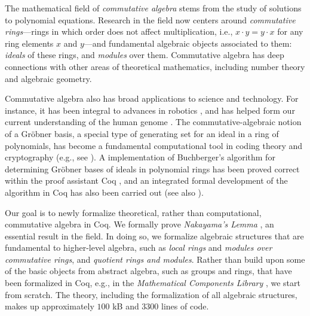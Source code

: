 \documentclass{article}
\begin{document}
The mathematical field of \emph{commutative algebra} stems from the study of solutions to polynomial equations.  Research in the field now centers around \emph{commutative rings}---rings in which order does not affect multiplication, i.e., $x \cdot y = y \cdot x$ for any ring elements $x$ and $y$---and fundamental algebraic objects associated to them:  \emph{ideals} of these rings, and \emph{modules} over them. 
Commutative algebra has deep connections with other areas of theoretical mathematics, including number theory and algebraic geometry. 

Commutative algebra also has broad applications to science and technology.  For instance, it has been integral to advances in robotics \cite{cox-little-oshea}, and has helped form our current understanding of the human genome \cite{genetic-algebra}. 
The commutative-algebraic notion of a Gr\"obner basis, a special type of generating set for an ideal in a ring of polynomials, has become a fundamental computational tool in 
coding theory and cryptography (e.g., see  \cite{grobner-bases-cryptography}).
A implementation of Buchberger's algorithm \cite{buchberger} for determining 
Gr\"obner bases of ideals in polynomial rings has been proved correct within the proof assistant Coq \cite{the_coq_development_team_2019_3476303,thery-buchberger}, and an integrated formal development of the algorithm in Coq has also been carried out \cite{persson2001integrated} (see also \cite{grobner-type-theory}). 

Our goal is to newly formalize theoretical, rather than computational, commutative algebra in Coq. 
We formally prove \emph{Nakayama's Lemma} \cite{nakayama-1951, azumaya}, an essential result in the field. 
In doing so, we formalize algebraic structures that are fundamental to higher-level algebra, such as 
\emph{local rings} and \emph{modules over commutative rings}, and \emph{quotient rings and modules}.  
Rather than build upon some of the basic objects from abstract algebra, such as groups and rings, that have been formalized in Coq, e.g., in the  
\emph{Mathematical Components Library} 
\cite{mathcomp}, we start from scratch. 
 The theory, including the formalization of all algebraic structures, makes up approximately $100$ kB and 3300 lines of code.
 
\end{document}
